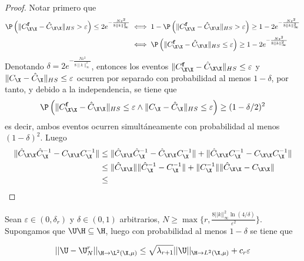\begin{proof}
	Notar primero que
	\begin{equation*}
		\begin{aligned}
			\P \left( \|C_{\X \X}^{\mathbf{f}}  - \hat{C}_{\X \X}\|_{HS} > \varepsilon \right) \leq 2e^{-\frac{N\varepsilon^2}{8\|k\|_\infty^2}} &\iff 1 - \P \left( \|C_{\X \X}^{\mathbf{f}}  - \hat{C}_{\X \X}\|_{HS} > \varepsilon \right)  \geq 1 - 2e^{-\frac{N\varepsilon^2}{8\|k\|_\infty^2}} \\
			&\iff \P \left( \|C_{\X \X}^{\mathbf{f}}  - \hat{C}_{\X \X}\|_{HS} \leq \varepsilon \right)  \geq 1 - 2e^{-\frac{N\varepsilon^2}{8\|k\|_\infty^2}}
		\end{aligned}
	\end{equation*}
	Denotando $\delta = 2e^{-\frac{N\varepsilon^2}{8\|k\|_\infty^2}}$, entonces los eventos $\|C_{\X \X}^{\mathbf{f}}  - \hat{C}_{\X \X}\|_{HS} \leq \varepsilon$ y $\|C_{\X}  - \hat{C}_{\X}\|_{HS} \leq \varepsilon$ ocurren por separado con probabilidad al menos $1 - \delta$, por tanto, y debido a la independencia, se tiene que 
	\begin{equation*}
		\P \left( \|C_{\X \X}^{\mathbf{f}}  - \hat{C}_{\X \X}\|_{HS} \leq \varepsilon \land \|C_{\X}  - \hat{C}_{\X}\|_{HS} \leq \varepsilon \right) \geq (1 - \delta/2)^2 
	\end{equation*}
	es decir, ambos eventos ocurren simultáneamente con probabilidad al menos $(1 - \delta)^2$. Luego
	\begin{equation*}
		\begin{aligned}
			\| \hat{C}_{\X \X} \hat{C}_{\X}^{-1} - C_{\X \X} C_{\X}^{-1} \| & \leq \| \hat{C}_{\X \X} \hat{C}_{\X}^{-1} - \hat{C}_{\X \X} C_{\X}^{-1} \| + \| \hat{C}_{\X \X} C_{\X}^{-1} - C_{\X \X} C_{\X}^{-1} \| \\
			&  \leq \| \hat{C}_{\X \X} \| \| \hat{C}_{\X}^{-1} - C_{\X}^{-1} \| + \| C_{\X}^{-1} \| \| \hat{C}_{\X \X} - C_{\X \X} \| \\
			& \leq 
		\end{aligned}
	\end{equation*} 
\end{proof}

\begin{teo}
    Sean $\varepsilon \in (0, \delta_r)$ y $\delta \in (0, 1)$ arbitrarios, $N \geq \max \{ r, \frac{8 || k ||_\infty^2 \ln (4/\delta)}{\varepsilon^2} \}$. Supongamos que $\U \H \subseteq \H$, luego con probabilidad al menos $1 - \delta$ se tiene que 
    
    \begin{equation*}
        || \U - \U_N^r ||_{\H \to \L^2(\X, \mu)} \leq \sqrt{\lambda_{r+1}} || \U ||_{\H \to L^2(\X, \mu)} + c_r \varepsilon
    \end{equation*}
\end{teo}

